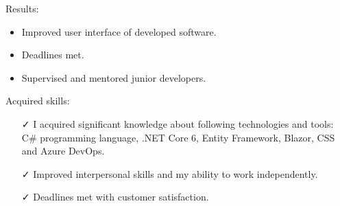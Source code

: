 \documentclass[english,10pt,a4paper]{article}
\newcommand{\Color}[1]{\textcolor{CvColor}{#1}}
\newcommand{\CvCheck}{\textcolor{CvColor}{\faCheck}}
\begin{document}
\begin{paracol}{2}
\begin{tcolorbox}[colback=white, height=\textheight, colframe=white, left=0cm]
\begin{itemize}
{\begin{itemize}
					\textcolor{CvColor}{Results:}
					\begin{itemize}
						\item Improved user interface of developed software. 
						\item Deadlines met.
						\item Supervised and mentored junior developers.
					\end{itemize}
					
					
					\textcolor{CvColor}{Acquired skills:}
					\begin{itemize}
						\item[\CvCheck] I acquired significant knowledge about following technologies and tools: \Color{C\#} programming language, \Color{.NET Core 6}, \Color{Entity Framework}, \Color{Blazor}, \Color{CSS} and \Color{Azure DevOps}.
						\item[\CvCheck] Improved interpersonal skills and my ability to work independently.
						\item[\CvCheck] Deadlines met with customer satisfaction. 
					\end{itemize}						
				\end{itemize}
			}
		
		
		
		
	\end{itemize}
	



\end{tcolorbox}
\end{paracol}
\newpage
\end{document}
